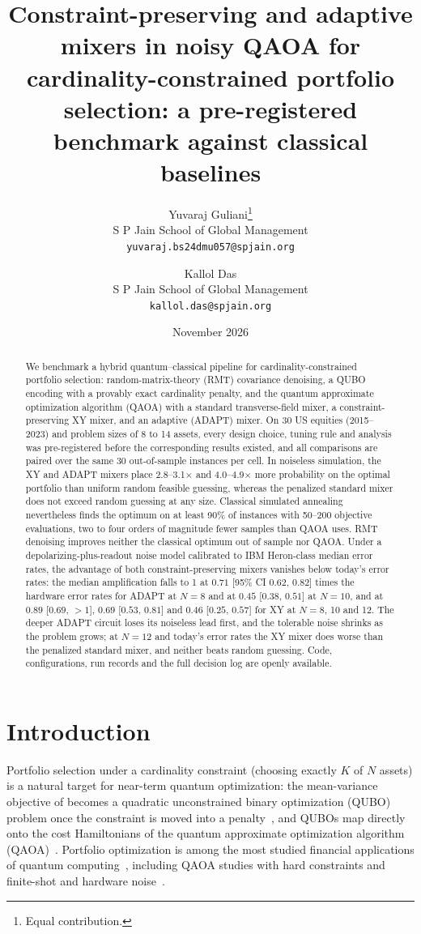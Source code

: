 \documentclass[11pt]{article}
\title{Constraint-preserving and adaptive mixers in noisy QAOA for cardinality-constrained
portfolio selection: a pre-registered benchmark against classical baselines}
\author{
  Yuvaraj Guliani\thanks{Equal contribution.}\\
  S P Jain School of Global Management\\
  \texttt{yuvaraj.bs24dmu057@spjain.org}
  \and
  Kallol Das\footnotemark[1]\\
  S P Jain School of Global Management\\
  \texttt{kallol.das@spjain.org}
}
\date{November 2026}
\begin{document}
\maketitle

\begin{abstract}
We benchmark a hybrid quantum--classical pipeline for cardinality-constrained portfolio
selection: random-matrix-theory (RMT) covariance denoising, a QUBO encoding with a provably
exact cardinality penalty, and the quantum approximate optimization algorithm (QAOA) with a
standard transverse-field mixer, a constraint-preserving XY mixer, and an adaptive (ADAPT)
mixer. On 30 US equities (2015--2023) and problem sizes of 8 to 14 assets, every design choice,
tuning rule and analysis was pre-registered before the corresponding results existed, and all
comparisons are paired over the same 30 out-of-sample instances per cell. In noiseless
simulation, the XY and ADAPT mixers place 2.8--3.1$\times$ and 4.0--4.9$\times$ more probability
on the optimal portfolio than uniform random feasible guessing, whereas the penalized standard
mixer does not exceed random guessing at any size. Classical simulated annealing nevertheless
finds the optimum on at least 90\% of instances with 50--200 objective evaluations, two to four
orders of magnitude fewer samples than QAOA uses. RMT denoising improves neither the classical
optimum out of sample nor QAOA. Under a depolarizing-plus-readout noise model calibrated to IBM
Heron-class median error rates, the advantage of both constraint-preserving mixers vanishes
below today's error rates: the median amplification falls to 1 at $0.71$ [95\% CI $0.62$,
$0.82$] times the hardware error rates for ADAPT at $N=8$ and at $0.45$ [$0.38$, $0.51$] at
$N=10$, and at $0.89$ [$0.69$, $>1$], $0.69$ [$0.53$, $0.81$] and $0.46$ [$0.25$, $0.57$] for XY
at $N=8$, 10 and 12. The deeper ADAPT circuit loses its noiseless lead first, and the tolerable
noise shrinks as the problem grows; at $N=12$ and today's error rates the XY mixer does worse
than the penalized standard mixer, and neither beats random guessing.
Code, configurations, run records and the full decision log are openly available.
\end{abstract}

\section{Introduction}
Portfolio selection under a cardinality constraint (choosing exactly $K$ of $N$ assets) is a
natural target for near-term quantum optimization: the mean-variance objective of
\citet{markowitz1952} becomes a quadratic unconstrained binary optimization (QUBO) problem once
the constraint is moved into a penalty~\citep{lucas2014}, and QUBOs map directly onto the cost
Hamiltonians of the quantum approximate optimization algorithm (QAOA)~\citep{farhi2014qaoa}.
Portfolio optimization is among the most studied financial applications of quantum
computing~\citep{egger2020,herman2023}, including QAOA studies with hard constraints and
finite-shot and hardware noise~\citep{hodson2019,brandhofer2022}.
\end{document}
